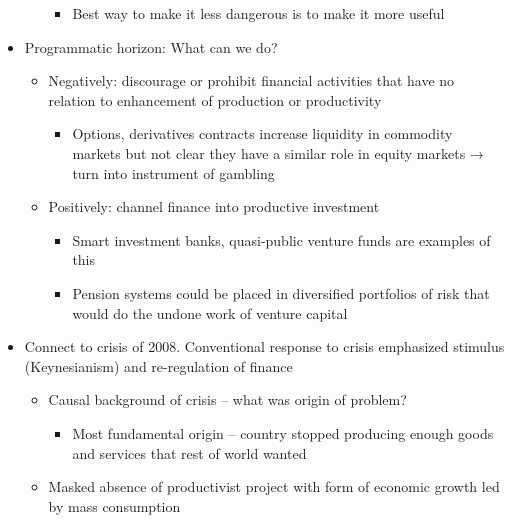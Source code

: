 \begin{itemize}
\begin{itemize}
    \begin{itemize}
    \tightlist
    \item
      Best way to make it less dangerous is to make it more useful
    \end{itemize}
  \end{itemize}
\item
  Programmatic horizon: What can we do?

  \begin{itemize}
  \tightlist
  \item
    Negatively: discourage or prohibit financial activities that have no
    relation to enhancement of production or productivity

    \begin{itemize}
    \tightlist
    \item
      Options, derivatives contracts increase liquidity in commodity
      markets but not clear they have a similar role in equity markets →
      turn into instrument of gambling
    \end{itemize}
  \item
    Positively: channel finance into productive investment

    \begin{itemize}
    \tightlist
    \item
      Smart investment banks, quasi-public venture funds are examples of
      this
    \item
      Pension systems could be placed in diversified portfolios of risk
      that would do the undone work of venture capital
    \end{itemize}
  \end{itemize}
\item
  Connect to crisis of 2008. Conventional response to crisis emphasized
  stimulus (Keynesianism) and re-regulation of finance

  \begin{itemize}
  \tightlist
  \item
    Causal background of crisis -- what was origin of problem?

    \begin{itemize}
    \tightlist
    \item
      Most fundamental origin -- country stopped producing enough goods
      and services that rest of world wanted
    \end{itemize}
  \item
    Masked absence of productivist project with form of economic growth
    led by mass consumption


\end{itemize}
\end{itemize}
